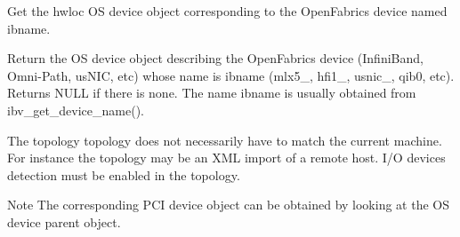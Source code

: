 Get the hwloc OS device object corresponding to the Open\+Fabrics device named {\ttfamily ibname}. 

Return the OS device object describing the Open\+Fabrics device (Infini\+Band, Omni-\/\+Path, us\+N\+IC, etc) whose name is {\ttfamily ibname} (mlx5\+\_, hfi1\+\_, usnic\+\_, qib0, etc). Returns N\+U\+LL if there is none. The name {\ttfamily ibname} is usually obtained from ibv\+\_\+get\+\_\+device\+\_\+name().

The topology {\ttfamily topology} does not necessarily have to match the current machine. For instance the topology may be an X\+ML import of a remote host. I/O devices detection must be enabled in the topology.

\begin{DoxyNote}{Note}
The corresponding P\+CI device object can be obtained by looking at the OS device parent object. 
\end{DoxyNote}
